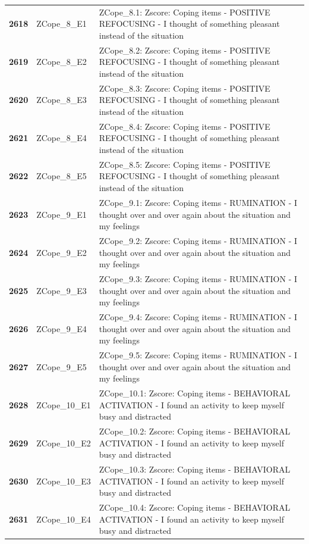 \documentclass[
  letterpaper,
  DIV=11,
  numbers=noendperiod]{scrartcl}
\begin{document}
\begin{longtable}[t]{>{}cll}
\textbf{2618} & ZCope\_8\_E1 & ZCope\_8.1: Zscore:  Coping items - POSITIVE REFOCUSING - I thought of something pleasant instead of the situation\\
\textbf{2619} & ZCope\_8\_E2 & ZCope\_8.2: Zscore:  Coping items - POSITIVE REFOCUSING - I thought of something pleasant instead of the situation\\
\textbf{2620} & ZCope\_8\_E3 & ZCope\_8.3: Zscore:  Coping items - POSITIVE REFOCUSING - I thought of something pleasant instead of the situation\\
\addlinespace
\textbf{2621} & ZCope\_8\_E4 & ZCope\_8.4: Zscore:  Coping items - POSITIVE REFOCUSING - I thought of something pleasant instead of the situation\\
\textbf{2622} & ZCope\_8\_E5 & ZCope\_8.5: Zscore:  Coping items - POSITIVE REFOCUSING - I thought of something pleasant instead of the situation\\
\textbf{2623} & ZCope\_9\_E1 & ZCope\_9.1: Zscore:  Coping items - RUMINATION - I thought over and over again about the situation and my feelings\\
\textbf{2624} & ZCope\_9\_E2 & ZCope\_9.2: Zscore:  Coping items - RUMINATION - I thought over and over again about the situation and my feelings\\
\textbf{2625} & ZCope\_9\_E3 & ZCope\_9.3: Zscore:  Coping items - RUMINATION - I thought over and over again about the situation and my feelings\\
\addlinespace
\textbf{2626} & ZCope\_9\_E4 & ZCope\_9.4: Zscore:  Coping items - RUMINATION - I thought over and over again about the situation and my feelings\\
\textbf{2627} & ZCope\_9\_E5 & ZCope\_9.5: Zscore:  Coping items - RUMINATION - I thought over and over again about the situation and my feelings\\
\textbf{2628} & ZCope\_10\_E1 & ZCope\_10.1: Zscore:  Coping items - BEHAVIORAL ACTIVATION - I found an activity to keep myself busy and distracted\\
\textbf{2629} & ZCope\_10\_E2 & ZCope\_10.2: Zscore:  Coping items - BEHAVIORAL ACTIVATION - I found an activity to keep myself busy and distracted\\
\textbf{2630} & ZCope\_10\_E3 & ZCope\_10.3: Zscore:  Coping items - BEHAVIORAL ACTIVATION - I found an activity to keep myself busy and distracted\\
\addlinespace
\textbf{2631} & ZCope\_10\_E4 & ZCope\_10.4: Zscore:  Coping items - BEHAVIORAL ACTIVATION - I found an activity to keep myself busy and distracted\\

\end{longtable}
\end{document}
